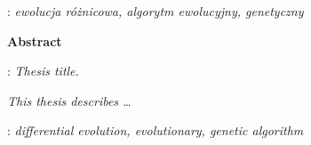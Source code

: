\begin{titlepage}
    : {\itshape ewolucja różnicowa, algorytm ewolucyjny, genetyczny}
    \par
    \vspace{4\baselineskip}
    \begin{center}
	{\large\bfseries Abstract}\par\bigskip
    \end{center}
    : {\itshape Thesis title.}\par
    \vspace*{1\baselineskip}
    {\itshape
    This thesis describes \ldots}
    \vspace*{1\baselineskip}

    : {\itshape differential evolution, evolutionary, genetic algorithm}

\end{titlepage}